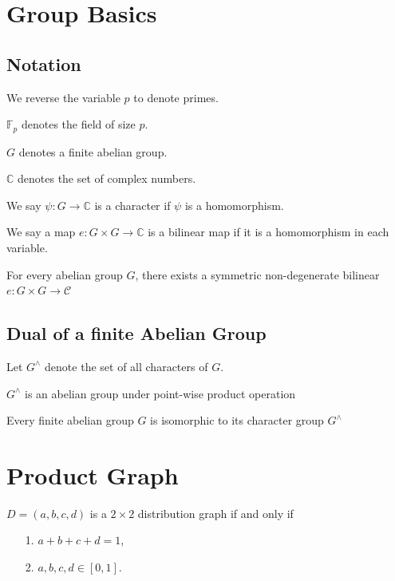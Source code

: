 \section{Group Basics}
\subsection{Notation}
We reverse the variable $p$ to denote primes.

$\mathbb{F}_p$ denotes the field of size $p$.

$G$ denotes a finite abelian group. 

$\mathbb{C}$ denotes the set of complex numbers.

\begin{definition}
We say $\psi : G \rightarrow \mathbb{C}$ is a character if $\psi$ is a homomorphism. 
\end{definition}

\begin{definition}
We say a map $e : G \times G  \rightarrow \mathbb{C}$ is a bilinear map if it is a homomorphism in each variable. 
\end{definition}
\begin{theorem}
For every abelian group $G$, there exists a symmetric non-degenerate bilinear $e : G \times G \rightarrow \mathcal{C}$ 
\end{theorem}
\subsection{Dual of a finite Abelian Group}
Let $G^\land$ denote the set of all characters of $G$. \\

\begin{lemma}
$G^\land$ is an abelian group under point-wise product operation 
\end{lemma}

\begin{theorem}
Every finite abelian group $G$ is isomorphic to its character group $G^\land$
\end{theorem}

\section{Product Graph}
\begin{definition}
$D = (a,b,c,d)$ is a $2 \times 2$ distribution graph if and only if 
\begin{itemize}
\item [1.] $a+b+c+d=1$,
\item [2.] $a,b,c,d \in [0,1]$.   
\end{itemize}
\end{definition}

